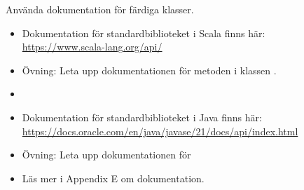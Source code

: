 




\fi


\begin{Slide}{Använda dokumentation för färdiga klasser.}
\begin{itemize}
  \item Dokumentation för standardbiblioteket i Scala finns här:  \\ \url{https://www.scala-lang.org/api/}
  \item Övning: Leta upp dokumentationen för metoden  i klassen .
  \item[]
  \item Dokumentation för standardbiblioteket i Java finns här:  \\ 
  \url{https://docs.oracle.com/en/java/javase/21/docs/api/index.html}
  \item Övning: Leta upp dokumentationen för 
  \item Läs mer i Appendix E om dokumentation.

\end{itemize}
\end{Slide}
  

